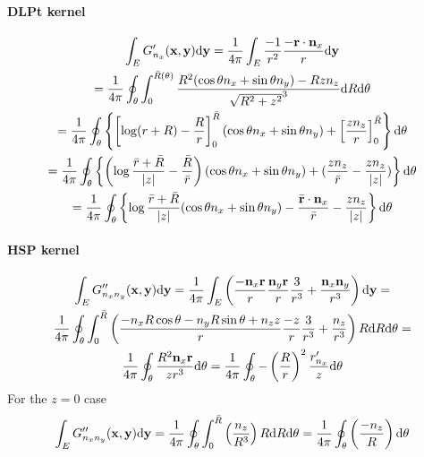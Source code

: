 \paragraph{DLPt kernel}

\begin{multline}
	\int_E G'_{n_x}({\bf x}, {\bf y}) \mathrm{d} {\bf y}
	= \frac{1}{4\pi} \int_{E} \frac{-1}{r^2} \frac{-{\bf r} \cdot {\bf n}_x }{r} \mathrm{d} {\bf y} \\
	= \frac{1}{4\pi} \oint_{\theta} \int_{0}^{\bar{R}(\theta)} \frac{R^2 (\cos\theta n_x + \sin\theta n_y) - R z n_z }{\sqrt{R^2 + z^2}^3}
	\mathrm{d} R \mathrm{d} \theta
	\\
	= \frac{1}{4\pi} \oint_{\theta} \left\{
	\left[ \log (r + R) - \frac{R}{r}\right]_{0}^{\bar{R}} (\cos\theta n_x + \sin\theta n_y)
	+ \left[ \frac{z n_z}{r} \right]_{0}^{\bar{R}}
	\right\} \mathrm{d} \theta
	\\
	= \frac{1}{4\pi} \oint_{\theta} \left\{
	\left(\log \frac{\bar{r} + \bar{R}}{|z|} - \frac{\bar{R}}{\bar{r}} \right) (\cos\theta n_x + \sin\theta n_y)
	+ (\frac{z n_z}{\bar{r}} - \frac{z n_z}{|z|})
	\right\} \mathrm{d} \theta
	\\
	= \frac{1}{4\pi} \oint_{\theta} \left\{
	\log \frac{\bar{r} + \bar{R}}{|z|}(\cos\theta n_x + \sin\theta n_y) - \frac{\bar{\bf r} \cdot {\bf n}_x}{\bar{r}} 
	- \frac{z n_z}{|z|}
	\right\} \mathrm{d} \theta
\end{multline}

\paragraph{HSP kernel}

\begin{multline}
	\int_E
		G''_{n_x n_y}({\bf x}, {\bf y})
	\mathrm{d} {\bf y}
	=
	\frac{1}{4\pi}
	\int_E 
	\left(
		\frac{-{\bf n}_x {\bf r}}{r} \frac{{\bf n}_y {\bf r}}{r} \frac{3}{r^3}
		+
		\frac{{\bf n}_x {\bf n}_y}{r^3}
	\right) \mathrm{d}{\bf y}
	= \\
	\frac{1}{4\pi}
	\oint_\theta \int_0^{\bar{R}} 
	\left(
		\frac{-n_x R \cos\theta - n_y R \sin\theta + n_z z}{r} \frac{-z}{r} \frac{3}{r^3}
		+
		\frac{n_z}{r^3}
	\right) R \mathrm{d} R \mathrm{d}\theta
	= \\
	\frac{1}{4\pi}
	\oint_\theta
		\frac{R^2 {\bf n}_x {\bf r}}{z r^3}
	\mathrm{d}\theta
	=
	\frac{1}{4\pi}
	\oint_\theta
		-\left(\frac{R}{r}\right)^2 \frac{r'_{n_x}}{z}
	\mathrm{d}\theta
\end{multline}
%
For the $z=0$ case
%
\begin{equation}
	\int_E
		G''_{n_x n_y}({\bf x}, {\bf y})
	\mathrm{d} {\bf y}
	=
	\frac{1}{4\pi}
	\oint_\theta \int_0^{\bar{R}} 
	\left(
		\frac{n_z}{R^3}
	\right) R \mathrm{d} R \mathrm{d}\theta
	= 
	\frac{1}{4\pi}
	\oint_\theta
	\left(
		\frac{-n_z}{R}
	\right)
	\mathrm{d}\theta
\end{equation}

